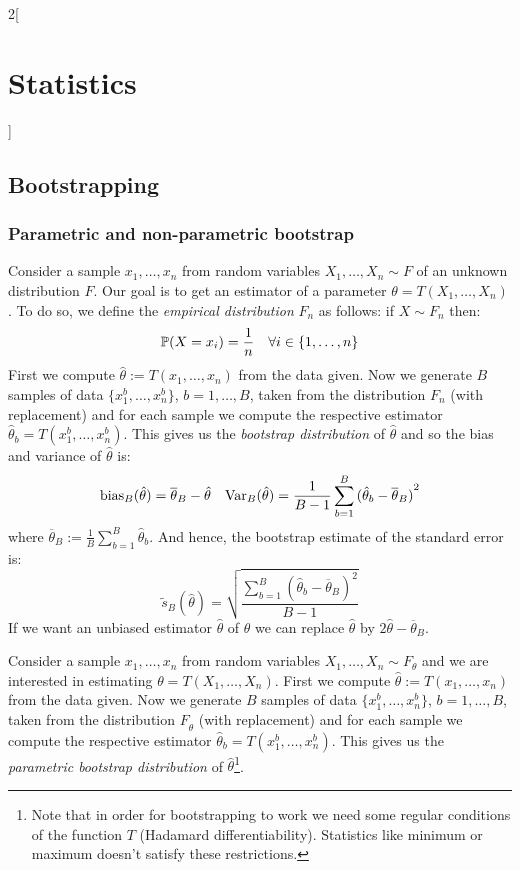 \documentclass[../../../main_math.tex]{subfiles}
\begin{document}
\begin{multicols}{2}[\section{Statistics}]
  \subsection{Bootstrapping}
  \subsubsection{Parametric and non-parametric bootstrap}
  \begin{definition}
    Consider a sample $x_1,\ldots,x_n$ from \iid random variables $X_1,\ldots,X_n\sim F$ of an unknown distribution $F$. Our goal is to get an estimator of a parameter $\theta=T(X_1,\ldots,X_n)$. To do so, we define the \emph{empirical distribution} $F_n$ as follows: if $X\sim F_n$ then: $$\mathbb{P}(X=x_i)=\frac{1}{n}\quad\forall i\in\{1,\ldots,n\}$$ First we compute ${\hat\theta}:=T(x_1,\ldots,x_n)$ from the data given.
    Now we generate $B$ samples of data $\{{x_1^b},\ldots,{x_n^b}\}$, $b=1,\ldots,B$, taken from the distribution $F_n$ (with replacement) and for each sample we compute the respective estimator ${\hat\theta}_b=T({x_1^b},\ldots,{x_n^b})$. This gives us the \emph{bootstrap distribution} of ${\hat\theta}$ and so the bias and variance of ${\hat\theta}$ is:
    $$\operatorname{bias}_B({\hat\theta})=\overline{\theta}_B-{\hat\theta}\quad\mathrm{Var}_B({\hat\theta})=\frac{1}{B-1}\sum_{b=1}^B{({\hat\theta}_b-\overline{\theta}_B)}^2$$
    where $\overline{\theta}_B:=\frac{1}{B}\sum_{b=1}^B{\hat\theta}_b$. And hence, the bootstrap estimate of the standard error is:
    $$\tilde{s}_B(\hat\theta)=\sqrt{\frac{\sum_{b=1}^B{({\hat\theta}_b-\overline{\theta}_B)}^2}{B-1}}$$
    If we want an unbiased estimator ${\hat\theta}$ of $\theta$ we can replace ${\hat\theta}$ by $2{\hat\theta}-\overline{\theta}_B$.
  \end{definition}
  \begin{definition}
    Consider a sample $x_1,\ldots,x_n$ from \iid random variables $X_1,\ldots,X_n\sim F_{\theta}$ and we are interested in estimating $\theta=T(X_1,\ldots,X_n)$. First we compute ${\hat\theta}:=T(x_1,\ldots,x_n)$ from the data given.
    Now we generate $B$ samples of data $\{{x_1^b},\ldots,{x_n^b}\}$, $b=1,\ldots,B$, taken from the distribution $F_{{\hat\theta}}$ (with replacement) and for each sample we compute the respective estimator ${\hat\theta}_b=T({x_1^b},\ldots,{x_n^b})$. This gives us the \emph{parametric bootstrap distribution} of ${\hat\theta}$\footnote{Note that in order for bootstrapping to work we need some regular conditions of the function $T$ (Hadamard differentiability). Statistics like minimum or maximum doesn't satisfy these restrictions.}.
  \end{definition}

\end{multicols}
\end{document}
